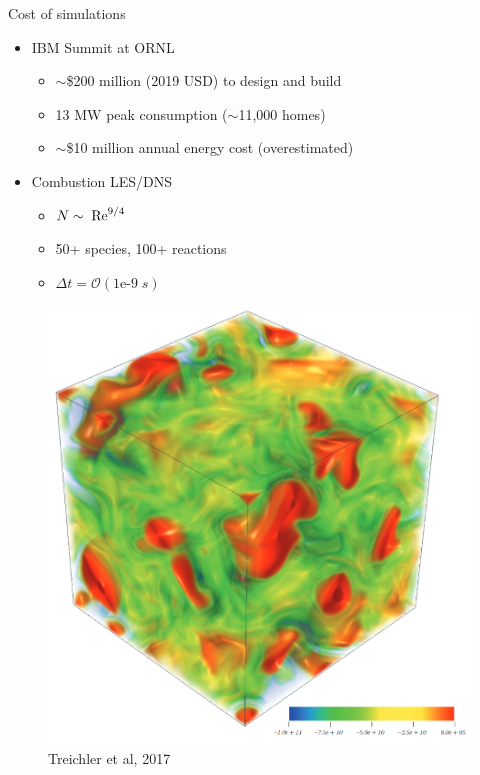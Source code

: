 \documentclass[]{beamer}
\begin{document}
\begin{frame}{Cost of simulations}
    \begin{itemize}
        \item IBM Summit at ORNL
        \begin{itemize}
            \item $\sim$\$200 million (2019 USD) to design and build
            \item 13 MW peak consumption ($\sim$11,000 homes)
            \item $\sim$\$10 million annual energy cost (overestimated)
        \end{itemize}
        \item Combustion LES/DNS
        \begin{itemize}
            \item $N \sim \; \text{Re}^{9/4}$
            \item 50+ species, 100+ reactions
            \item $\Delta t = \mathcal{O}(1\text{e-}9 \; s)$
        \end{itemize}
    \end{itemize}
	\centering
	\begin{minipage}{0.3\linewidth}
		\centering
		\begin{figure}
			\centering
			\includegraphics[width=0.91\linewidth]{intro/combustionDNS.png}
			\caption*{\tiny{Treichler et al, 2017}}

\end{figure}
\end{minipage}
\end{frame}
\end{document}

